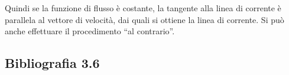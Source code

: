 Quindi se la funzione di flusso è costante, la tangente alla linea di corrente è parallela al vettore di velocità, dai quali si ottiene la linea di corrente.
Si può anche effettuare il procedimento ``al contrario''.

\subsection*{Bibliografia 3.6}
\cite[Cap.\ 9.1, 9.2, 9.3, 9.4, 9.5]{CengelCimbala}\\
\cite[Cap.\ 5.6, 5.8, 5.9, 5.11]{PnueliGutfinger}